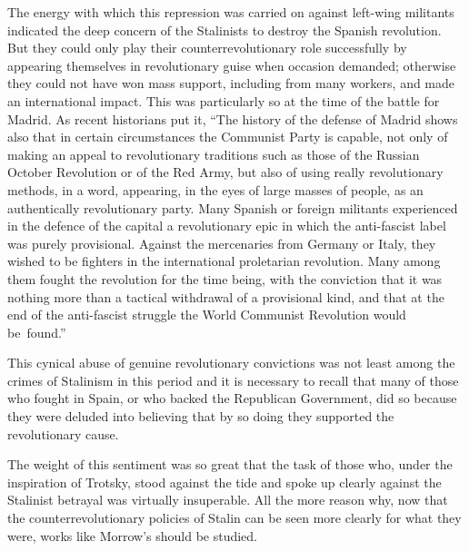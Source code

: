 The energy with which this repression was carried on against left-wing militants indicated the deep concern of the Stalinists to destroy the Spanish revolution. But they could only play their counterrevolutionary role successfully by appearing themselves in revolutionary guise when occasion demanded; otherwise they could not have won mass support, including from many workers, and made an international impact. This was particularly so at the time of the battle for Madrid. As recent historians put it, ``The history of the defense of Madrid shows also that in certain circumstances the Communist Party{\indexPCE} is capable, not only of making an appeal to revolutionary traditions such as those of the Russian October Revolution or of the Red Army, but also of using really revolutionary methods, in a word, appearing, in the eyes of large masses of people, as an authentically revolutionary party. Many Spanish or foreign militants experienced in the defence of the capital a revolutionary epic in which the anti-fascist label was purely provisional. Against the mercenaries from Germany or Italy, they wished to be fighters in the international proletarian revolution. Many among them fought the revolution for the time being, with the conviction that it was nothing more than a tactical withdrawal of a provisional kind, and that at the end of the anti-fascist struggle the World Communist Revolution would be~found.''

This cynical abuse of genuine revolutionary convictions was not least among the crimes of Stalinism in this period and it is necessary to recall that many of those who fought in Spain, or who backed the Republican Government, did so because they were deluded into believing that by so doing they supported the revolutionary cause.

The weight of this sentiment was so great that the task of those who, under the inspiration of Trotsky, stood against the tide and spoke up clearly against the Stalinist betrayal was virtually insuperable. All the more reason why, now that the counterrevolutionary policies of Stalin can be seen more clearly for what they were, works like Morrow’s should be studied.

